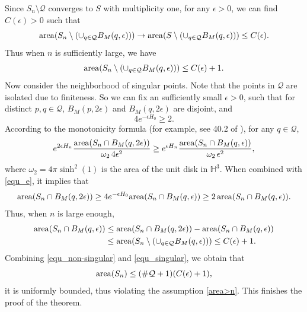 \documentclass[12pt,a4paper]{amsart}
\numberwithin{equation}{section}
\theoremstyle{plain}
\theoremstyle{named}
\theoremstyle{definition}
\newcommand{\area}{{\rm{area}}}
\begin{document}
     Since $S_n\setminus\mathcal{Q}$ converges to $S$ with multiplicity one, for any $\epsilon>0$, we can find $C(\epsilon)>0$ such that \begin{equation*}
         \area(S_n\setminus (\cup _{q\in\mathcal{Q}}B_M(q,\epsilon)))\rightarrow \area(S\setminus (\cup _{q\in\mathcal{Q}}B_M(q,\epsilon))) \leq C(\epsilon).
     \end{equation*}
     Thus when $n$ is sufficiently large, we have
     \begin{equation}\label{equ_non-singular}
         \area(S_n\setminus (\cup _{q\in\mathcal{Q}}B_M(q,\epsilon)))\leq C(\epsilon)+1.
     \end{equation}
     Now consider the neighborhood of singular points. Note that the points in $\mathcal{Q}$ are isolated due to finiteness. So we can fix an sufficiently small $\epsilon>0$, such that for distinct $p,q\in\mathcal{Q}$, $B_M(p, 2\epsilon)$ and $B_M(q,2\epsilon)$ are disjoint, and \begin{equation}\label{equ_e}
         4e^{-\epsilon H_0}\geq 2.
     \end{equation} According to the monotonicity formula (for example, see 40.2 of \cite{Simon}), for any $q\in\mathcal{Q}$, \begin{equation}\label{equ_monotonicity}
         e^{2\epsilon H_n}\frac{\area(S_n\cap B_M(q,2\epsilon))}{\omega_2\,4\epsilon^2}\geq e^{\epsilon H_n}\frac{\area(S_n\cap B_M(q,\epsilon))}{\omega_2\,\epsilon^2},
     \end{equation}
     where $\omega_2=4\pi \sinh^2(1)$ is the area of the unit disk in $\mathbb{H}^3$. When combined with \eqref{equ_e}, it implies that \begin{equation*}
         \area(S_n\cap B_M(q,2\epsilon))\geq 4e^{-\epsilon H_0}\area(S_n\cap B_M(q,\epsilon))\geq 2\,\area(S_n\cap B_M(q,\epsilon)).
     \end{equation*}
     Thus, when $n$ is large enough, \begin{align}\label{equ_singular}
         \area(S_n\cap B_M(q,\epsilon))&\leq \area(S_n\cap B_M(q,2\epsilon)) -\area(S_n\cap B_M(q,\epsilon))\\\nonumber
         &\leq \area(S_n\setminus (\cup_{q\in\mathcal{Q}} B_M(q,\epsilon)))\leq C(\epsilon)+1.
     \end{align}
     Combining \eqref{equ_non-singular} and \eqref{equ_singular}, we obtain that \begin{equation*}
         \area(S_n)\leq (\#\mathcal{Q}+1)(C(\epsilon)+1),
     \end{equation*}
     it is uniformly bounded, thus violating the assumption \eqref{area>n}. This finishes the proof of the theorem. 
     
\end{document}
